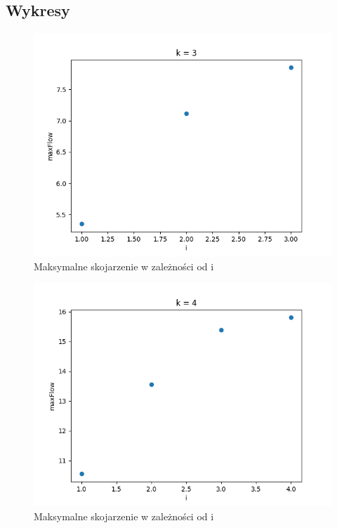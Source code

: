 \documentclass{report}
\begin{document}
\subsection*{Wykresy}
\begin{figure}[H]
    \centering
    \includegraphics[scale=0.55]{../ex2/plots/k3.png}
    \caption{Maksymalne skojarzenie w zależności od i}
\end{figure}
\begin{figure}[H]
    \centering
    \includegraphics[scale=0.55]{../ex2/plots/k4.png}
    \caption{Maksymalne skojarzenie w zależności od i}
\end{figure}
\end{document}

